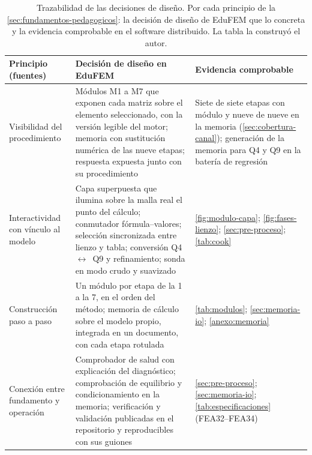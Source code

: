 \begin{table}[htbp]
\centering
\caption[Principios, decisiones de diseño y evidencia.]{Trazabilidad de las decisiones de diseño. Por cada principio de la \autoref{sec:fundamentos-pedagogicos}: la decisión de diseño de EduFEM que lo concreta y la evidencia comprobable en el software distribuido. La tabla la construyó el autor.}
\label{tab:principios}
{\footnotesize
\setlength{\tabcolsep}{3pt}
\renewcommand{\arraystretch}{1.12}
\begin{tabular}{@{}>{\raggedright\arraybackslash}p{3.4cm}>{\raggedright\arraybackslash}p{5.6cm}>{\raggedright\arraybackslash}p{5.4cm}@{}}
\toprule
\textbf{Principio (fuentes)} & \textbf{Decisión de diseño en EduFEM} & \textbf{Evidencia comprobable} \\
\midrule
Visibilidad del procedimiento \autocite[p.~157]{lee2015interactive} & Módulos M1 a M7 que exponen cada matriz sobre el elemento seleccionado, con la versión legible del motor; memoria con sustitución numérica de las nueve etapas; respuesta expuesta junto con su procedimiento & Siete de siete etapas con módulo y nueve de nueve en la memoria (\autoref{sec:cobertura-canal}); generación de la memoria para Q4 y Q9 en la batería de regresión \\
Interactividad con vínculo al modelo \autocite[pp.~163, 166]{lee2015interactive} & Capa superpuesta que ilumina sobre la malla real el punto del cálculo; conmutador fórmula--valores; selección sincronizada entre lienzo y tabla; conversión Q4~$\leftrightarrow$~Q9 y refinamiento; sonda en modo crudo y suavizado & \autoref{fig:modulo-capa}; \autoref{fig:fases-lienzo}; \autoref{sec:pre-proceso}; \autoref{tab:cook} \\
Construcción paso a paso \autocite[pp.~1010-1011, 1023]{bishay2020teaching} & Un módulo por etapa de la 1 a la 7, en el orden del método; memoria de cálculo sobre el modelo propio, integrada en un documento, con cada etapa rotulada & \autoref{tab:modulos}; \autoref{sec:memoria-io}; \autoref{anexo:memoria} \\
Conexión entre fundamento y operación \autocite[pp.~1159, 1168]{perezsantiago2023fem} & Comprobador de salud con explicación del diagnóstico; comprobación de equilibrio y condicionamiento en la memoria; verificación y validación publicadas en el repositorio y reproducibles con sus guiones & \autoref{sec:pre-proceso}; \autoref{sec:memoria-io}; \autoref{tab:especificaciones} (FEA32--FEA34) \\
\bottomrule
\end{tabular}}
\end{table}


